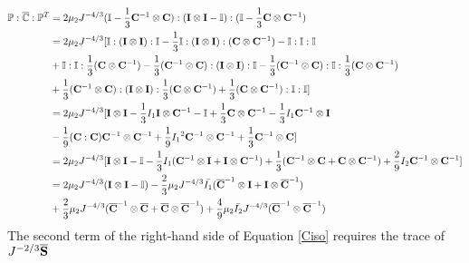 \begin{equation} \label{part11}
\begin{split}
\mathbb{P} : {\overline{\mathbb{C}}} : {\mathbb{P}}^T 
&= 2\mu_2{J^{-4/3}} (\mathbb{I} - \frac{1}{3}{\bold{C}}^{-1} \otimes {\bold{C}})
: (\bold{I} \otimes \bold{I} - \mathbb{I}) : (\mathbb{I} - \frac{1}{3}\bold{C} \otimes {\bold{C}}^{-1}) \\
&= 2\mu_2{J^{-4/3}}[\mathbb{I} : (\bold{I} \otimes \bold{I}) : \mathbb{I} - \frac{1}{3}\mathbb{I} : (\bold{I} \otimes \bold{I}) : ({{\bold{C}}} \otimes {{\bold{C}}}^{-1}) - \mathbb{I} : \mathbb{I} : \mathbb{I} \\
&+ \mathbb{I} : \mathbb{I} : \frac{1}{3}({\bold{C}} \otimes {{\bold{C}}}^{-1}) - 
\frac{1}{3}({{\bold{C}}}^{-1} \otimes {\bold{C}} ) : (\bold{I} \otimes \bold{I}) : \mathbb{I}
- \frac{1}{3}({{\bold{C}}}^{-1} \otimes {\bold{C}} ) :  \mathbb{I} : \frac{1}{3}({{\bold{C}}} \otimes {{\bold{C}} }^{-1}) \\
&+ \frac{1}{3}({{\bold{C}}}^{-1} \otimes {\bold{C}} ) : (\bold{I} \otimes \bold{I}) : \frac{1}{3}({{\bold{C}}} \otimes {{\bold{C}}}^{-1} ) + \frac{1}{3}({{\bold{C}}} \otimes {{\bold{C}}}^{-1}) : \mathbb{I} : \mathbb{I}
] \\
&= 2\mu_2{J^{-4/3}}[\bold{I} \otimes \bold{I} - \frac{1}{3}{I_1}\bold{I} \otimes {{\bold{C}}}^{-1} - \mathbb{I} + \frac{1}{3}{\bold{C}} \otimes {{\bold{C}}}^{-1} -  \frac{1}{3}{I_1}{{\bold{C}}}^{-1} \otimes \bold{I} \\
&- \frac{1}{9}({\bold{C}} : {\bold{C}}){{\bold{C}}}^{-1} \otimes {{\bold{C}}}^{-1} + \frac{1}{9}{{I_1}}^2{{\bold{C}}}^{-1} \otimes {{\bold{C}}}^{-1} +  \frac{1}{3}{{\bold{C}}}^{-1} \otimes {{\bold{C}}}] \\
&= 2\mu_2{J}^{-4/3}[\bold{I} \otimes \bold{I} - \mathbb{I} - \frac{1}{3}{I_1}({{\bold{C}}}^{-1} \otimes \bold{I} + \bold{I}\otimes{{\bold{C}}}^{-1} ) +
\frac{1}{3}({{\bold{C}}}^{-1} \otimes {\bold{C}} + {\bold{C}}\otimes{{\bold{C}}}^{-1} )  + \frac{2}{9}{I_2} {{\bold{C}}}^{-1} \otimes {{\bold{C}}}^{-1}] \\
&= 2\mu_2{J}^{-4/3}(\bold{I} \otimes \bold{I} - \mathbb{I}) - \frac{2}{3}\mu_2J^{-4/3}\bar{I_1}({\overline{\bold{C}}}^{-1} \otimes \bold{I} + \bold{I} \otimes {\overline{\bold{C}}}^{-1}) \\
&+
\frac{2}{3}\mu_2J^{-4/3}({\overline{\bold{C}}}^{-1} \otimes {\overline{\bold{C}}} + {\overline{\bold{C}}} \otimes {\overline{\bold{C}}}^{-1}) + \frac{4}{9}\mu_2\bar{I_2}J^{-4/3}({\overline{\bold{C}}}^{-1} \otimes {\overline{\bold{C}}}^{-1})
\end{split}
\end{equation}
The second term of the right-hand side of Equation \ref{Ciso} requires the trace of $J^{-2/3}\overline{\bold{S}}$

